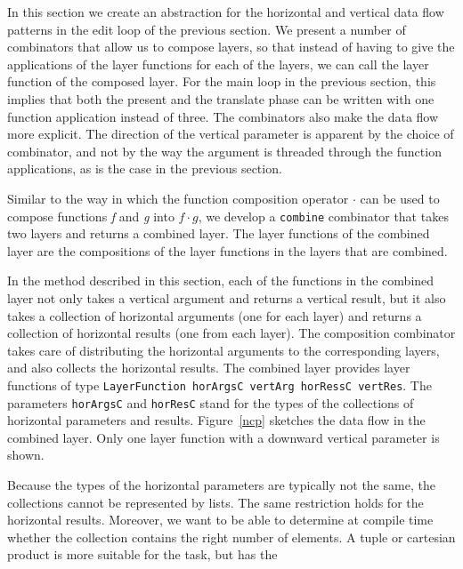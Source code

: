 \par In this section we create an
      abstraction for the horizontal and vertical data flow patterns in the edit loop
      of the previous section. We present a number of combinators that allow us to
      compose layers, so that instead of having to give the applications of the layer
      functions for each of the layers, we can call the layer function of the
      composed layer. For the main loop in the previous section, this implies that
      both the present and the translate phase can be written with one function
      application instead of three. The combinators also make the data flow more
      explicit. The direction of the vertical parameter is apparent by the choice of
      combinator, and not by the way the argument is threaded through the function
      applications, as is the case in the previous section. 
\par Similar to the way in which the function composition operator $\cdot$
      can be used to compose functions {\em f} and {\em g} into $f \cdot g$, we
      develop a \texttt{combine} combinator that takes two layers and returns a
      combined layer. The layer functions of the combined layer are the compositions
      of the layer functions in the layers that are combined.
\par In the method described in this section, each of the functions in the
      combined layer not only takes a vertical argument and returns a vertical
      result, but it also takes a collection of horizontal arguments (one for each
      layer) and returns a collection of horizontal results (one from each layer).
      The composition combinator takes care of distributing the horizontal arguments
      to the corresponding layers, and also collects the horizontal results. The
      combined layer provides layer functions of type \texttt{LayerFunction horArgsC
      vertArg horRessC vertRes}. The parameters \texttt{horArgsC} and
      \texttt{horResC} stand for the types of the collections of horizontal
      parameters and results. Figure~\ref{ncp} sketches the data flow
      in the combined layer. Only one layer function with a downward vertical
      parameter is shown.
\par Because the types of the horizontal parameters are typically not the
      same, the collections cannot be represented by lists. The same restriction
      holds for the horizontal results. Moreover, we want to be able to determine at
      compile time whether the collection contains the right number of elements. A
      tuple or cartesian product is more suitable for the task, but has the
